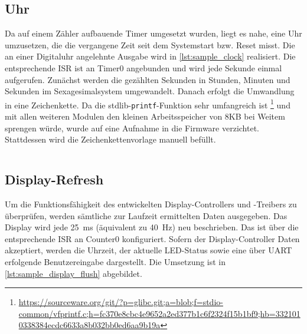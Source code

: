 \begin{code}
	\inputminted[autogobble, firstline=97, lastline=120, firstnumber=97]{C}{attachments/Plasma-SoC/sw/examples/src/sample.c}
	\caption{UART-Eingabe}
	\label{lst:sample_uart_input_handler}
\end{code}

\subsection{Uhr}

Da auf einem Zähler aufbauende Timer umgesetzt wurden, liegt es nahe, eine Uhr umzusetzen, die die vergangene Zeit seit dem Systemstart bzw. Reset misst. 
Die an einer Digitaluhr angelehnte Ausgabe wird in \cref{lst:sample_clock} realisiert. Die entsprechende \gls{ISR} ist an Timer0 angebunden und wird jede Sekunde einmal aufgerufen. Zunächst werden die gezählten Sekunden in Stunden, Minuten und Sekunden im Sexagesimalsystem umgewandelt. Danach erfolgt die Umwandlung in eine Zeichenkette. Da die stdlib-\texttt{printf}-Funktion sehr umfangreich ist \footnote{\url{https://sourceware.org/git/?p=glibc.git;a=blob;f=stdio-common/vfprintf.c;h=fc370e8cbc4e9652a2ed377b1c6f2324f15b1bf9;hb=3321010338384ecdc6633a8b032bb0ed6aa9b19a}} und mit allen weiteren Modulen den kleinen Arbeitsspeicher von 8KB bei Weitem sprengen würde, wurde auf eine Aufnahme in die Firmware verzichtet. Stattdessen wird die Zeichenkettenvorlage manuell befüllt. 

\begin{code}
	\inputminted[autogobble, firstline=122, lastline=151, firstnumber=122]{C}{attachments/Plasma-SoC/sw/examples/src/sample.c}
	\caption{Uhranzeige}
	\label{lst:sample_clock}
\end{code}

\subsection{Display-Refresh}

Um die Funktionsfähigkeit des entwickelten Display-Controllers und -Treibers zu überprüfen, werden sämtliche zur Laufzeit ermittelten Daten ausgegeben.
Das Display wird jede \SI{25}{\milli\second} (äquivalent zu \SI{40}{\hertz}) neu beschrieben. Das ist über die entsprechende \gls{ISR} an Counter0 konfiguriert. Sofern der Display-Controller Daten akzeptiert, werden die Uhrzeit, der aktuelle LED-Status sowie eine über UART erfolgende Benutzereingabe dargestellt. Die Umsetzung ist in \cref{lst:sample_display_flush} abgebildet.

